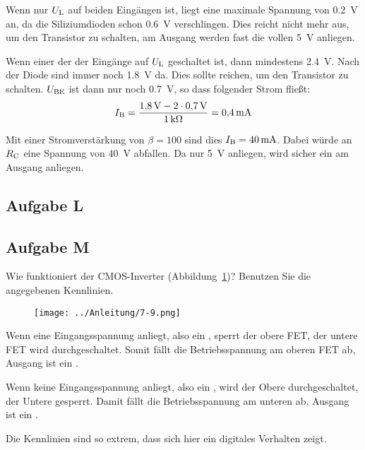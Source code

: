 Wenn nur $\UL$ auf beiden Eingängen ist, liegt eine maximale Spannung von
\SI{.2}{\volt} an, da die Siliziumdioden schon \SI{.6}{\volt} verschlingen.
Dies reicht nicht mehr aus, um den Transistor zu schalten, am Ausgang werden
fast die vollen \SI{5}{\volt} anliegen.

Wenn einer der der Eingänge auf $\UL$ geschaltet ist, dann mindestens
\SI{2.4}{\volt}. Nach der Diode sind immer noch \SI{1.8}{\volt} da. Dies sollte
reichen, um den Transistor zu schalten. $\UBE$ ist dann nur noch
\SI{.7}{\volt}, so dass folgender Strom fließt:
\[
	\IB = \frac{\SI{1.8}\volt - 2 \cdot \SI{.7}\volt}{\SI1{\kilo\ohm}}
	= \SI{.4}{\milli\ampere}
\]

Mit einer Stromverstärkung von $\beta = 100$ sind dies $\IB =
\SI{40}{\milli\ampere}$. Dabei würde an $\RC$ eine Spannung von \SI{40}{\volt}
abfallen. Da nur \SI{5}{\volt} anliegen, wird sicher ein \thigh{} am Ausgang
anliegen.

\FloatBarrier
\subsection{Aufgabe L}

\fehlt

\FloatBarrier
\subsection{Aufgabe M}

\begin{problem}
	Wie funktioniert der CMOS-Inverter (Abbildung~\ref{fig:7-9})? Benutzen Sie
	die angegebenen Kennlinien.
\end{problem}

\begin{figure}[htbp]
	\centering
	\texttt{[image: ../Anleitung/7-9.png]}
	\caption{%
		\cite[Abbildung~7.9]{physik313-Anleitung}
	}
	\label{fig:7-9}
\end{figure}

Wenn eine Eingangsspannung anliegt, also ein \thigh, sperrt der obere FET, der
untere FET wird durchgeschaltet. Somit fällt die Betriebsspannung am oberen FET
ab, Ausgang ist ein \tlow.

Wenn keine Eingangsspannung anliegt, also ein \tlow, wird der Obere
durchgeschaltet, der Untere gesperrt. Damit fällt die Betriebsspannung am
unteren ab, Ausgang ist ein \thigh.

Die Kennlinien sind so extrem, dass sich hier ein digitales Verhalten zeigt.

